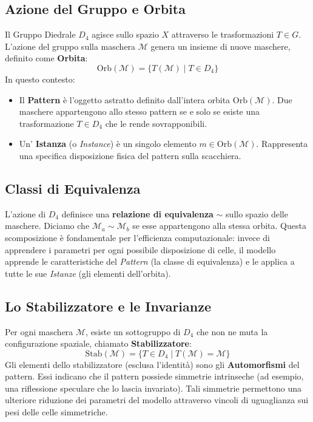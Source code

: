 \subsection{Azione del Gruppo e Orbita}
Il Gruppo Diedrale $D_4$ agisce sullo spazio $X$ attraverso le trasformazioni $T \in G$. L'azione del gruppo sulla maschera $\mathcal{M}$ genera un insieme di nuove maschere, definito come \textbf{Orbita}:
\begin{equation}
    \text{Orb}(\mathcal{M}) = \{ T(\mathcal{M}) \mid T \in D_4 \}
\end{equation}
In questo contesto:
\begin{itemize}
    \item Il \textbf{Pattern} è l'oggetto astratto definito dall'intera orbita $\text{Orb}(\mathcal{M})$. Due maschere appartengono allo stesso pattern se e solo se esiste una trasformazione $T \in D_4$ che le rende sovrapponibili.
    \item Un' \textbf{Istanza} (o \textit{Instance}) è un singolo elemento $m \in \text{Orb}(\mathcal{M})$. Rappresenta una specifica disposizione fisica del pattern sulla scacchiera.
\end{itemize}

\subsection{Classi di Equivalenza}
L'azione di $D_4$ definisce una \textbf{relazione di equivalenza} $\sim$ sullo spazio delle maschere. Diciamo che $\mathcal{M}_a \sim \mathcal{M}_b$ se esse appartengono alla stessa orbita.
Questa scomposizione è fondamentale per l'efficienza computazionale: invece di apprendere i parametri per ogni possibile disposizione di celle, il modello apprende le caratteristiche del \textit{Pattern} (la classe di equivalenza) e le applica a tutte le sue \textit{Istanze} (gli elementi dell'orbita).

\subsection{Lo Stabilizzatore e le Invarianze}
Per ogni maschera $\mathcal{M}$, esiste un sottogruppo di $D_4$ che non ne muta la configurazione spaziale, chiamato \textbf{Stabilizzatore}:
\begin{equation}
    \text{Stab}(\mathcal{M}) = \{ T \in D_4 \mid T(\mathcal{M}) = \mathcal{M} \}
\end{equation}
Gli elementi dello stabilizzatore (esclusa l'identità) sono gli \textbf{Automorfismi} del pattern. Essi indicano che il pattern possiede simmetrie intrinseche (ad esempio, una riflessione speculare che lo lascia invariato). Tali simmetrie permettono una ulteriore riduzione dei parametri del modello attraverso vincoli di uguaglianza sui pesi delle celle simmetriche.

